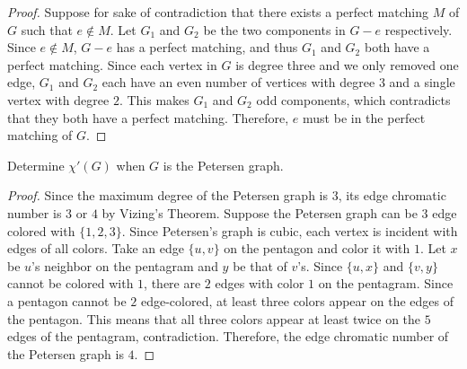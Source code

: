 \documentclass{article}
\newenvironment{problem}[2][Problem]{\begin{trivlist}
\item[\hskip \labelsep {\bfseries #1}\hskip \labelsep {\bfseries #2.}]}{\end{trivlist}}
\begin{document}
\begin{proof}
    Suppose for sake of contradiction that there exists a perfect matching $M$ of $G$ such that $e \notin M$. Let $G_1$ and $G_2$ be the two components in $G - e$ respectively. Since $e \notin M$, $G - e$ has a perfect matching, and thus $G_1$ and $G_2$ both have a perfect matching. Since each vertex in $G$ is degree three and we only removed one edge, $G_1$ and $G_2$ each have an even number of vertices with degree $3$ and a single vertex with degree $2$. This makes $G_1$ and $G_2$ odd components, which contradicts that they both have a perfect matching. Therefore, $e$ must be in the perfect matching of $G$.
\end{proof}

\begin{problem}{3.8.5}
    Determine $\chi{'}(G)$ when $G$ is the Petersen graph.
\end{problem}

\begin{proof}
    Since the maximum degree of the Petersen graph is $3$, its edge chromatic number is $3$ or $4$ by Vizing's Theorem. Suppose the Petersen graph can be $3$ edge colored with $\{1, 2, 3\}$. Since Petersen's graph is cubic, each vertex is incident with edges of all colors. Take an edge $\{u, v\}$ on the pentagon and color it with $1$. Let $x$ be $u$'s neighbor on the pentagram and $y$ be that of $v$'s. Since $\{u, x\}$ and $\{v, y\}$ cannot be colored with $1$, there are $2$ edges with color $1$ on the pentagram. Since a pentagon cannot be $2$ edge-colored, at least three colors appear on the edges of the pentagon. This means that all three colors appear at least twice on the $5$ edges of the pentagram, contradiction. Therefore, the edge chromatic number of the Petersen graph is $4$. 
\end{proof}
\end{document}
